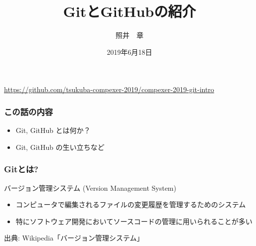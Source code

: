 \documentclass[dvipdfmx]{beamer}
\title{GitとGitHubの紹介}
\author{照井　章}
\institute{筑波大学 数理物質系}
\date{2019年6月18日}
\begin{document}
    
\begin{frame}
    \frametitle{}
    \titlepage

    \begin{center}
        \url{https://github.com/tsukuba-compexer-2019/compexer-2019-git-intro}
    \end{center}
\end{frame}

\begin{frame}
    \frametitle{この話の内容}
    \large
    \begin{itemize}
        \item Git, GitHub とは何か？
        \item Git, GitHub の生い立ちなど
    \end{itemize}
\end{frame}

\begin{frame}
    \frametitle{Gitとは?}

    \begin{block}{バージョン管理システム (Version Management System)}
        \begin{itemize}
            \item コンピュータで編集されるファイルの変更履歴を管理するためのシステム
            \item 特にソフトウェア開発においてソースコードの管理に用いられることが多い
        \end{itemize}
    \end{block}

    \begin{flushright}
        出典: Wikipedia「バージョン管理システム」\cite{vcs}
    \end{flushright}
\end{frame}
\end{document}
